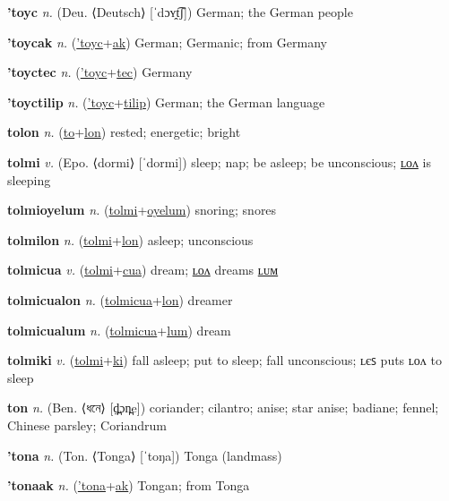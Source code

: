 \textbf{\hypertarget{'toyc}{'toyc}} \textit{n.} (Deu. ⟨Deutsch⟩ [ˈdɔʏ̯t͡ʃ])
German; the German people

\textbf{\hypertarget{'toycak}{'toycak}} \textit{n.} (\hyperlink{'toyc}{'toyc}+\allowbreak \hyperlink{ak}{ak})
German; Germanic; from Germany

\textbf{\hypertarget{'toyctec}{'toyctec}} \textit{n.} (\hyperlink{'toyc}{'toyc}+\allowbreak \hyperlink{tec}{tec})
Germany

\textbf{\hypertarget{'toyctilip}{'toyctilip}} \textit{n.} (\hyperlink{'toyc}{'toyc}+\allowbreak \hyperlink{tilip}{tilip})
German; the German language

\textbf{\hypertarget{tolon}{tolon}} \textit{n.} (\hyperlink{to}{to}+\allowbreak \hyperlink{lon}{lon})
rested; energetic; bright

\textbf{\hypertarget{tolmi}{tolmi}} \textit{v.} (Epo. ⟨dormi⟩ [ˈdormi])
sleep; nap; be asleep; be unconscious; \hyperlink{tolmilon}{ʟᴏᴧ} is sleeping

\textbf{\hypertarget{tolmioyelum}{tolmioyelum}} \textit{n.} (\hyperlink{tolmi}{tolmi}+\allowbreak \hyperlink{oyelum}{oyelum})
snoring; snores

\textbf{\hypertarget{tolmilon}{tolmilon}} \textit{n.} (\hyperlink{tolmi}{tolmi}+\allowbreak \hyperlink{lon}{lon})
asleep; unconscious

\textbf{\hypertarget{tolmicua}{tolmicua}} \textit{v.} (\hyperlink{tolmi}{tolmi}+\allowbreak \hyperlink{cua}{cua})
dream; \hyperlink{tolmicualon}{ʟᴏᴧ} dreams \hyperlink{tolmicualum}{ʟᴜᴍ}

\textbf{\hypertarget{tolmicualon}{tolmicualon}} \textit{n.} (\hyperlink{tolmicua}{tolmicua}+\allowbreak \hyperlink{lon}{lon})
dreamer

\textbf{\hypertarget{tolmicualum}{tolmicualum}} \textit{n.} (\hyperlink{tolmicua}{tolmicua}+\allowbreak \hyperlink{lum}{lum})
dream

\textbf{\hypertarget{tolmiki}{tolmiki}} \textit{v.} (\hyperlink{tolmi}{tolmi}+\allowbreak \hyperlink{ki}{ki})
fall asleep; put to sleep; fall unconscious; ʟєꜱ puts ʟᴏᴧ to sleep

\textbf{\hypertarget{ton}{ton}} \textit{n.} (Ben. ⟨{\bengali{}ধনে}⟩ [d̪̤ɔn̪e])
coriander; cilantro; anise; star anise; badiane; fennel; Chinese parsley; Coriandrum

\textbf{\hypertarget{'tona}{'tona}} \textit{n.} (Ton. ⟨Tonga⟩ [ˈtoŋa])
Tonga (landmass)

\textbf{\hypertarget{'tonaak}{'tonaak}} \textit{n.} (\hyperlink{'tona}{'tona}+\allowbreak \hyperlink{ak}{ak})
Tongan; from Tonga

